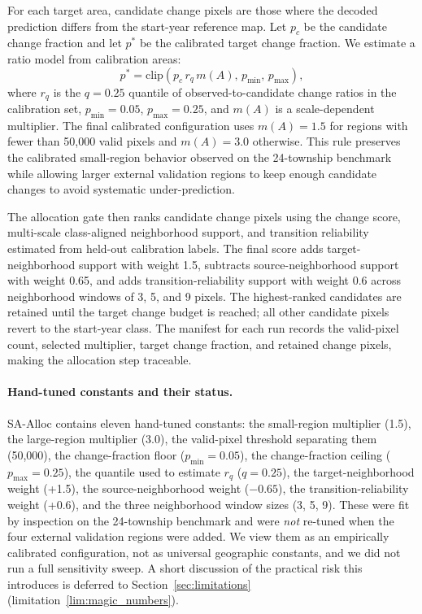 \documentclass{article}
\begin{document}
For each target area, candidate change pixels are those where the decoded prediction differs from the start-year reference map. Let $p_c$ be the candidate change fraction and let $p^\ast$ be the calibrated target change fraction. We estimate a ratio model from calibration areas:
\begin{equation}
p^\ast = \mathrm{clip}\left(p_c \, r_q \, m(A),\, p_{\min},\, p_{\max}\right),
\end{equation}
where $r_q$ is the $q=0.25$ quantile of observed-to-candidate change ratios in the calibration set, $p_{\min}=0.05$, $p_{\max}=0.25$, and $m(A)$ is a scale-dependent multiplier. The final calibrated configuration uses $m(A)=1.5$ for regions with fewer than 50{,}000 valid pixels and $m(A)=3.0$ otherwise. This rule preserves the calibrated small-region behavior observed on the 24-township benchmark while allowing larger external validation regions to keep enough candidate changes to avoid systematic under-prediction.

The allocation gate then ranks candidate change pixels using the change score, multi-scale class-aligned neighborhood support, and transition reliability estimated from held-out calibration labels. The final score adds target-neighborhood support with weight 1.5, subtracts source-neighborhood support with weight 0.65, and adds transition-reliability support with weight 0.6 across neighborhood windows of 3, 5, and 9 pixels. The highest-ranked candidates are retained until the target change budget is reached; all other candidate pixels revert to the start-year class. The manifest for each run records the valid-pixel count, selected multiplier, target change fraction, and retained change pixels, making the allocation step traceable.

\paragraph{Hand-tuned constants and their status.} SA-Alloc contains eleven hand-tuned constants: the small-region multiplier (1.5), the large-region multiplier (3.0), the valid-pixel threshold separating them (50{,}000), the change-fraction floor ($p_{\min}=0.05$), the change-fraction ceiling ($p_{\max}=0.25$), the quantile used to estimate $r_q$ ($q=0.25$), the target-neighborhood weight (+1.5), the source-neighborhood weight ($-0.65$), the transition-reliability weight (+0.6), and the three neighborhood window sizes (3, 5, 9). These were fit by inspection on the 24-township benchmark and were \emph{not} re-tuned when the four external validation regions were added. We view them as an empirically calibrated configuration, not as universal geographic constants, and we did not run a full sensitivity sweep. A short discussion of the practical risk this introduces is deferred to Section~\ref{sec:limitations} (limitation~\ref{lim:magic_numbers}).
\end{document}
